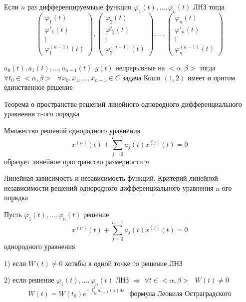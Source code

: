 \begin{block}[Заменачание]
  Если $n$ раз дифференцируемыые функции $\varphi_1(t), \ldots, \varphi_n(t)$
  ЛНЗ тогда
  $$
  \left(
  \begin{array}{c}
    \varphi_1(t) \\
    \varphi'_1(t) \\
    \vdots \\
    \varphi_1^{(n-1)}(t)
  \end{array}
  \right)
  ,
  \left(
  \begin{array}{c}
    \varphi_2(t) \\
    \varphi'_2(t) \\
    \vdots \\
    \varphi_2^{(n-1)}(t)
  \end{array}
  \right)
  , \ldots ,
  \left(
  \begin{array}{c}
    \varphi_n(t) \\
    \varphi'_n(t) \\
    \vdots \\
    \varphi_n^{(n-1)}(t)
  \end{array}
  \right)
  $$
\end{block}

\begin{theorem}
  $a_0(t), a_1(t), \ldots, a_{n-1}(t), g(t)$ непрерывные на $<\alpha, \beta>$
  тогда
  $\forall t_0 \in <\alpha, \beta>
  ~~~
  \forall x_0, x_1, \ldots, x_{n-1} \in C$ задача Коши $(1,2)$ имеет и притом
  единственное решение
\end{theorem}

\begin{title}[\Large]
  Теорема о пространстве решений линейного однородного дифференциального
  уравнения n-ого порядка
\end{title}

\begin{theorem}
  Множество решений однородного уравнения
  $$
  x^{(n)}(t) + \sum_{j=0}^{n-1} a_j(t)x^{(j)}(t) = 0
  $$
  образует линейное пространство размерности $n$
\end{theorem}

\begin{title}[\Large]
  Линейная зависимость и независимость функций. Критерий линейной независимости
  решений однородного дифференциального уравнения n-ого порядка
\end{title}

\begin{block}
  Пусть $\varphi_1(t), \ldots, \varphi_n(t)$ решение
  $$
  x^{(n)}(t) + \sum_{j=0}^{n-1} a_j(t)x^{(j)}(t) = 0
  $$
  однородного уравнения

  1) если $W(t) \not= 0$ хотябы в одной точке то решение ЛНЗ

  2) если решение $\varphi_1(t), \ldots, \varphi_n(t)$ ЛНЗ $\Rightarrow$
  $\forall t \in <\alpha, \beta> ~~~ W(t) \not= 0$
  $$
  W(t) = W(t_0) e^{-\int_{t_0}^t a_{n-1}(s)ds}
  ~~~
  \text{формула Леовиля Остраградского}
  $$
\end{block}

